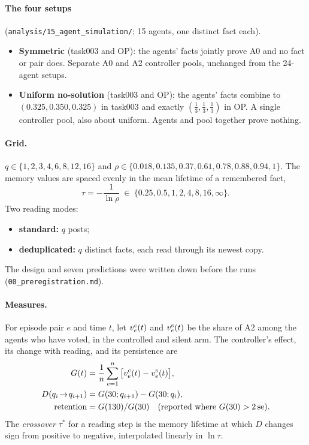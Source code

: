 \documentclass[10pt,a4paper]{article}
\begin{document}
\paragraph{The four setups} (\nolinkurl{analysis/15_agent_simulation/}; 15 agents, one distinct fact each).
\begin{itemize}
\item \textbf{Symmetric} (task003 and OP): the agents' facts jointly prove A0 and no fact or pair does. Separate A0
  and A2 controller pools, unchanged from the 24-agent setups.
\item \textbf{Uniform no-solution} (task003 and OP): the agents' facts combine to $(0.325, 0.350, 0.325)$ in task003
  and exactly $(\tfrac13,\tfrac13,\tfrac13)$ in OP. A single controller pool, also about uniform. Agents and pool
  together prove nothing.
\end{itemize}

\paragraph{Grid.} $q\in\{1,2,3,4,6,8,12,16\}$ and $\rho\in\{0.018, 0.135, 0.37, 0.61, 0.78, 0.88, 0.94, 1\}$. The
memory values are spaced evenly in the mean lifetime of a remembered fact,
\begin{equation}
\tau=-\frac{1}{\ln\rho}\ \in\ \{0.25, 0.5, 1, 2, 4, 8, 16, \infty\}.\label{eq:tau}
\end{equation}
Two reading modes:
\begin{itemize}
\item \textbf{standard:} $q$ posts;
\item \textbf{deduplicated:} $q$ distinct facts, each read through its newest copy.
\end{itemize}
The design and seven predictions were written down before the runs (\nolinkurl{00_preregistration.md}).

\paragraph{Measures.} For episode pair $e$ and time $t$, let $v^{\rm c}_e(t)$ and $v^{\rm s}_e(t)$ be the share of
A2 among the agents who have voted, in the controlled and silent arm. The controller's effect, its change with
reading, and its persistence are
\begin{align}
G(t)&=\frac{1}{n}\sum_{e=1}^{n}\big[v^{\rm c}_e(t)-v^{\rm s}_e(t)\big],\label{eq:G}\\
D(q_i\!\to\!q_{i+1})&=G(30;q_{i+1})-G(30;q_i),\label{eq:D}\\
\text{retention}&=G(130)/G(30)\quad(\text{reported where }G(30)>2\,\mathrm{se}).\label{eq:ret}
\end{align}
The \emph{crossover} $\tau^*$ for a reading step is the memory lifetime at which $D$ changes sign from positive to
negative, interpolated linearly in $\ln\tau$.
\end{document}
